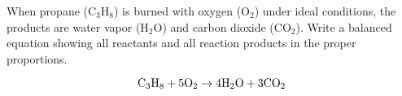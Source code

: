 

When propane (C$_{3}$H$_{8}$) is burned with oxygen (O$_{2}$) under ideal conditions, the products are water vapor (H$_{2}$O) and carbon dioxide (CO$_{2}$).  Write a balanced equation showing all reactants and all reaction products in the proper proportions.







$$\hbox{C}_3\hbox{H}_8 + \hbox{5O}_2 \to \hbox{4H}_2\hbox{O} + \hbox{3CO}_2$$











